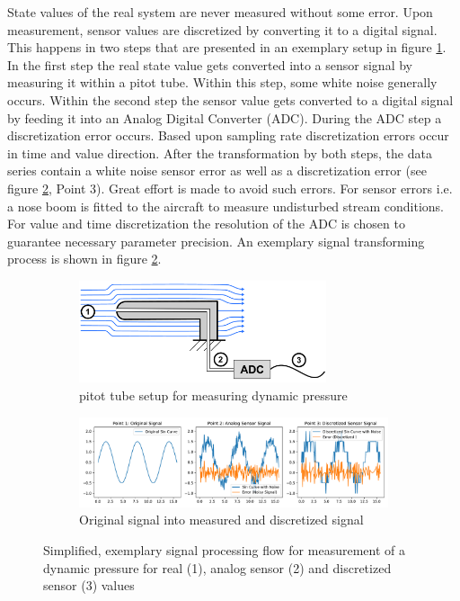 State values of the real system are never measured without some error. Upon measurement, sensor values are discretized by converting it to a digital signal. This happens in two steps that are presented in an exemplary setup in figure \ref{fig:signal_processing_setup}. In the first step the real state value gets converted into a sensor signal by measuring it within a pitot tube. Within this step, some white noise generally occurs. Within the second step the sensor value gets converted to a digital signal by feeding it into an Analog Digital Converter (ADC). During the ADC step a discretization error occurs. Based upon sampling rate discretization errors occur in time and value direction. After the transformation by both steps, the data series contain a white noise sensor error as well as a discretization error (see figure \ref{fig:signal_processing_plots}, Point 3). Great effort is made to avoid such errors. For sensor errors i.e. a nose boom is fitted to the aircraft to measure undisturbed stream conditions. For value and time discretization the resolution of the ADC is chosen to guarantee necessary parameter precision. An exemplary signal transforming process is shown in figure \ref{fig:signal_processing_plots}.

\begin{figure}[!h]
    \centering
    \begin{subfigure}{\textwidth}
        \centering
        \includegraphics[width=0.8\textwidth]{03_figures/signal_recording}
        \caption{pitot tube setup for measuring dynamic pressure}
        \label{fig:signal_processing_setup}
    \end{subfigure}
    \begin{subfigure}{\textwidth}
        \centering
        \includegraphics[width=\textwidth]{03_figures/python_functions/images/signal_processing_plots}
        \caption{Original signal into measured and discretized signal}
        \label{fig:signal_processing_plots}
    \end{subfigure}
    \caption{Simplified, exemplary signal processing flow for measurement of a dynamic pressure for real (1), analog sensor (2) and discretized sensor (3) values}
    \label{fig:signal_processing}
\end{figure}


